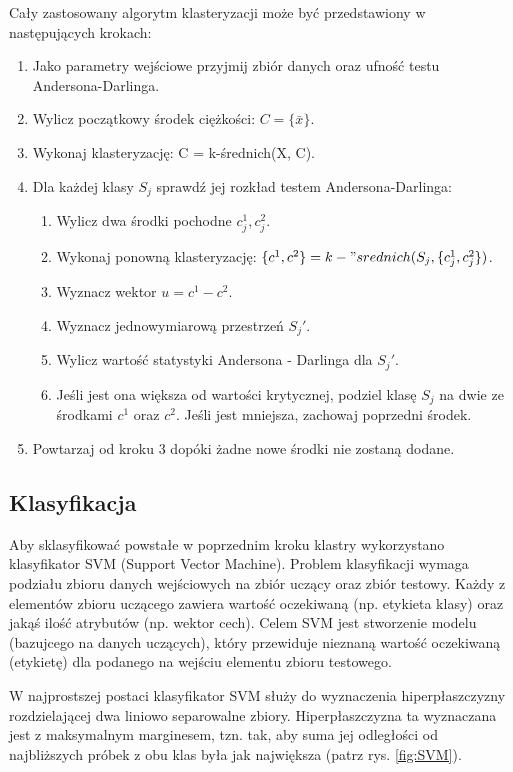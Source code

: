 Cały zastosowany algorytm klasteryzacji może być przedstawiony w następujących krokach:
\begin{enumerate}
	\item Jako parametry wejściowe przyjmij zbiór danych oraz ufność testu Andersona-Darlinga.
	\item Wylicz początkowy środek ciężkości: $C = \{\bar{x}\}$.
	\item Wykonaj klasteryzację: C = k-średnich(X, C).
	\item Dla każdej klasy $S_j$ sprawdź jej rozkład testem Andersona-Darlinga:
	\begin{enumerate}
		\item Wylicz dwa środki pochodne $c_j^1, c_j^2$.
		\item Wykonaj ponowną klasteryzację: $\{c^1, c^2\} = k-"srednich(S_j, \{c_j^1, c_j^2\})$.
		\item Wyznacz wektor $u = c^1 - c^2$.
		\item Wyznacz jednowymiarową przestrzeń $S_j '$.
		\item Wylicz wartość statystyki Andersona - Darlinga dla $S_j '$.
		\item Jeśli jest ona większa od wartości krytycznej, podziel klasę $S_j$ na dwie ze środkami $c^1$ oraz $c^2$. Jeśli jest mniejsza, zachowaj poprzedni środek.
	\end{enumerate}
	\item Powtarzaj od kroku 3 dopóki żadne nowe środki nie zostaną dodane.
\end{enumerate}

\subsection{Klasyfikacja}
\quad Aby sklasyfikować powstałe w poprzednim kroku klastry wykorzystano klasyfikator SVM (Support Vector Machine). Problem klasyfikacji wymaga podziału zbioru danych wejściowych na zbiór uczący oraz zbiór testowy. Każdy z elementów zbioru uczącego zawiera wartość oczekiwaną (np. etykieta klasy) oraz jakąś ilość atrybutów (np. wektor cech). Celem SVM jest stworzenie modelu (bazujcego na danych uczących), który przewiduje nieznaną wartość oczekiwaną (etykietę) dla podanego na wejściu elementu zbioru testowego. 

W najprostszej postaci klasyfikator SVM służy do wyznaczenia hiperpłaszczyzny rozdzielającej dwa liniowo separowalne zbiory. Hiperpłaszczyzna ta wyznaczana jest z maksymalnym marginesem, tzn. tak, aby suma jej odległości od najbliższych próbek z obu klas była jak największa (patrz rys. \ref{fig:SVM}).

